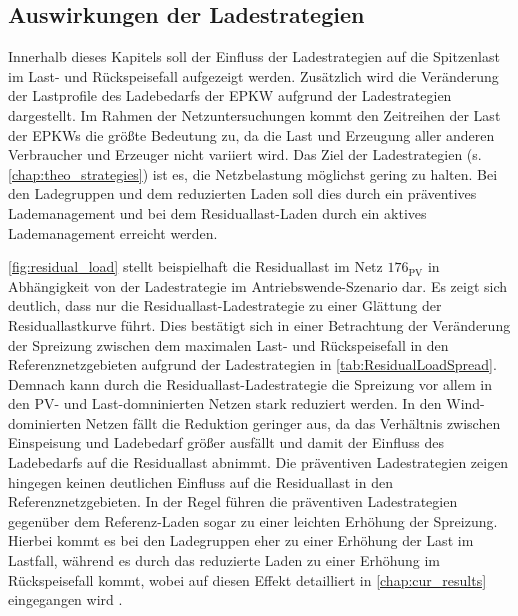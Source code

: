 


\subsection{Auswirkungen der Ladestrategien}\label{chap:results_charging_strategies}

Innerhalb dieses Kapitels soll der Einfluss der Ladestrategien auf die Spitzenlast im Last- und Rückspeisefall aufgezeigt werden.
Zusätzlich wird die Veränderung der Lastprofile des Ladebedarfs der \gls{EPKW} aufgrund der Ladestrategien dargestellt.
Im Rahmen der Netzuntersuchungen kommt den Zeitreihen der Last der \glspl{EPKW} die größte Bedeutung zu, da die Last und Erzeugung aller anderen Verbraucher und Erzeuger nicht variiert wird.
Das Ziel der Ladestrategien (s. \autoref{chap:theo_strategies}) ist es, die Netzbelastung möglichst gering zu halten.
Bei den Ladegruppen und dem reduzierten Laden soll dies durch ein präventives Lademanagement und bei dem Residuallast-Laden durch ein aktives Lademanagement erreicht werden.



\autoref{fig:residual_load} stellt beispielhaft die Residuallast im Netz \(176_{\text{PV}}\) in Abhängigkeit von der Ladestrategie im Antriebswende-Szenario dar.
Es zeigt sich deutlich, dass nur die Residuallast-Ladestrategie zu einer Glättung der Residuallastkurve führt.
Dies bestätigt sich in einer Betrachtung der Veränderung der Spreizung zwischen dem maximalen Last- und Rückspeisefall in den Referenznetzgebieten aufgrund der Ladestrategien in \autoref{tab:ResidualLoadSpread}.
Demnach kann durch die Residuallast-Ladestrategie die Spreizung vor allem in den \gls{PV}- und Last-domninierten Netzen stark reduziert werden.
In den Wind-dominierten Netzen fällt die Reduktion geringer aus, da das Verhältnis zwischen Einspeisung und Ladebedarf größer ausfällt und damit der Einfluss des Ladebedarfs auf die Residuallast abnimmt.
Die präventiven Ladestrategien zeigen hingegen keinen deutlichen Einfluss auf die Residuallast in den Referenznetzgebieten.
In der Regel führen die präventiven Ladestrategien gegenüber dem Referenz-Laden sogar zu einer leichten Erhöhung der Spreizung.
Hierbei kommt es bei den Ladegruppen eher zu einer Erhöhung der Last im Lastfall, während es durch das reduzierte Laden zu einer Erhöhung im Rückspeisefall kommt, wobei auf diesen Effekt detailliert in \autoref{chap:cur_results} eingegangen wird .

